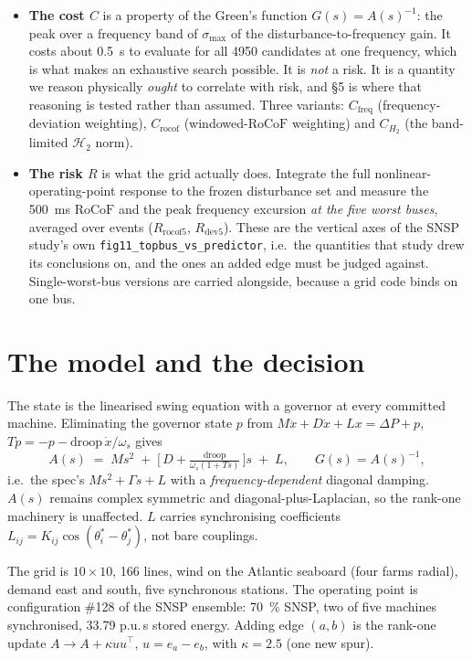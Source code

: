 \documentclass[11pt,a4paper]{article}
\newcommand{\rocof}{\ensuremath{\mathrm{RoCoF}}}
\newcommand{\Htwo}{\ensuremath{\mathcal{H}_2}}
\newcommand{\Cf}{\ensuremath{C_{\mathrm{freq}}}}
\newcommand{\Cr}{\ensuremath{C_{\mathrm{rocof}}}}
\newcommand{\CH}{\ensuremath{C_{H_2}}}
\newcommand{\Rr}{\ensuremath{R_{\mathrm{rocof}5}}}
\newcommand{\Rd}{\ensuremath{R_{\mathrm{dev}5}}}
\begin{document}
\begin{itemize}
  \item \textbf{The cost $C$} is a property of the Green's function
        $G(s)=A(s)^{-1}$: the peak over a frequency band of
        $\sigma_{\max}$ of the disturbance-to-frequency gain. It costs about
        \SI{0.5}{\second} to evaluate for all 4950 candidates at one frequency,
        which is what makes an exhaustive search possible. It is \emph{not} a
        risk. It is a quantity we reason physically \emph{ought} to correlate
        with risk, and \S5 is where that reasoning is tested rather than
        assumed. Three variants: \Cf{} (frequency-deviation weighting), \Cr{}
        (windowed-\rocof{} weighting) and \CH{} (the band-limited \Htwo{} norm).
  \item \textbf{The risk $R$} is what the grid actually does. Integrate the full
        nonlinear-operating-point response to the frozen disturbance set and
        measure the \SI{500}{\milli\second} \rocof{} and the peak frequency
        excursion \emph{at the five worst buses}, averaged over events
        ($\Rr$, $\Rd$). These are the vertical axes of the SNSP study's own
        \texttt{fig11\_topbus\_vs\_predictor}, i.e.\ the quantities that study
        drew its conclusions on, and the ones an added edge must be judged
        against. Single-worst-bus versions are carried alongside, because a grid
        code binds on one bus.
\end{itemize}

\section{The model and the decision}

The state is the linearised swing equation with a governor at every committed
machine. Eliminating the governor state $p$ from
$M\ddot x + D\dot x + Lx = \Delta P + p$, $T\dot p = -p - \mathrm{droop}\,\dot
x/\omega_s$ gives
\begin{equation}
A(s) \;=\; Ms^{2} \;+\; \Big[\,D + \tfrac{\mathrm{droop}}{\omega_s(1+Ts)}\,\Big]s \;+\; L,
\qquad G(s) = A(s)^{-1},
\label{eq:A}
\end{equation}
i.e.\ the spec's $Ms^2+\Gamma s+L$ with a \emph{frequency-dependent} diagonal
damping. $A(s)$ remains complex symmetric and diagonal-plus-Laplacian, so the
rank-one machinery is unaffected. $L$ carries synchronising coefficients
$L_{ij}=K_{ij}\cos(\theta^*_i-\theta^*_j)$, not bare couplings.

The grid is $10\times10$, 166 lines, wind on the Atlantic seaboard (four farms
radial), demand east and south, five synchronous stations. The operating point is
configuration \#128 of the SNSP ensemble: \SI{70}{\percent} SNSP, two of five
machines synchronised, 33.79 p.u.\,s stored energy. Adding edge $(a,b)$ is the
rank-one update $A \to A + \kappa uu^{\!\top}$, $u=e_a-e_b$, with $\kappa=2.5$
(one new spur).
\end{document}
